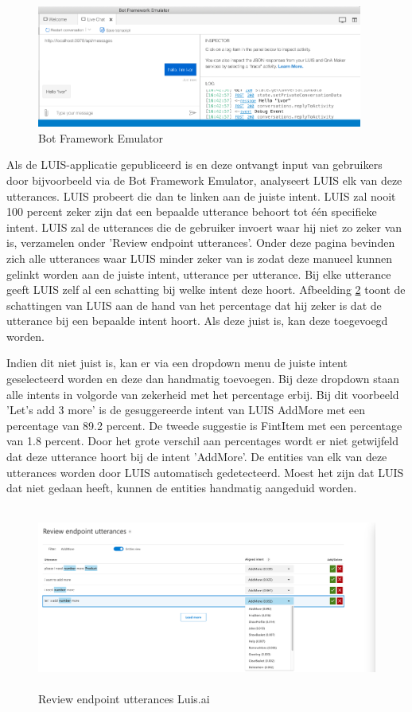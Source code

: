 \begin{figure}[h!]
	\centering
	\includegraphics[height=4cm]{img/emulator.png}
	\caption{Bot Framework Emulator}
	\label{fig:emulator}
\end{figure}

Als de LUIS-applicatie gepubliceerd is en deze ontvangt input van gebruikers door bijvoorbeeld via de Bot Framework Emulator, analyseert LUIS elk van deze utterances. LUIS probeert die dan te linken aan de juiste intent. LUIS zal nooit 100 percent zeker zijn dat een bepaalde utterance behoort tot één specifieke intent. LUIS zal de utterances die de gebruiker invoert waar hij niet zo zeker van is, verzamelen onder 'Review endpoint utterances'. Onder deze pagina bevinden zich alle utterances waar LUIS minder zeker van is zodat deze manueel kunnen gelinkt worden aan de juiste intent, utterance per utterance. Bij elke utterance geeft LUIS zelf al een schatting bij welke intent deze hoort. Afbeelding \ref{fig:review} toont de schattingen van LUIS aan de hand van het percentage dat hij zeker is dat de utterance bij een bepaalde intent hoort. Als deze juist is, kan deze toegevoegd worden. 

Indien dit niet juist is, kan er via een dropdown menu de juiste intent geselecteerd worden en deze dan handmatig toevoegen. Bij deze dropdown staan alle intents in volgorde van zekerheid met het percentage erbij. Bij dit voorbeeld 'Let's add 3 more' is de gesuggereerde intent van LUIS AddMore met een percentage van 89.2 percent. De tweede suggestie is FintItem met een percentage van 1.8 percent. Door het grote verschil aan percentages wordt er niet getwijfeld dat deze utterance hoort bij de intent 'AddMore'. De entities van elk van deze utterances worden door LUIS automatisch gedetecteerd. Moest het zijn dat LUIS dat niet gedaan heeft, kunnen de entities handmatig aangeduid worden.

\begin{figure}[h!]
	\centering
	\includegraphics[height=6cm]{img/review.png}
	\caption{Review endpoint utterances Luis.ai}
	\label{fig:review}
\end{figure}

